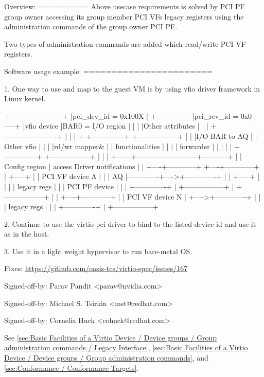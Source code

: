 {Overview:
=========
Above usecase requirements is solved by PCI PF group owner accessing
its group member PCI VFs legacy registers using the administration
commands of the group owner PCI PF.

Two types of administration commands are added which read/write PCI VF
registers.

Software usage example:
=======================

1. One way to use and map to the guest VM is by using vfio driver
framework in Linux kernel.

                +----------------------+
                |pci_dev_id = 0x100X   |
+---------------|pci_rev_id = 0x0      |-----+
|vfio device    |BAR0 = I/O region     |     |
|               |Other attributes      |     |
|               +----------------------+     |
|                                            |
+   +--------------+     +-----------------+ |
|   |I/O BAR to AQ |     | Other vfio      | |
|   |rd/wr mapper\& |     | functionalities | |
|   | forwarder    |     |                 | |
|   +--------------+     +-----------------+ |
|                                            |
+------+-------------------------+-----------+
       |                         |
   Config region                 |
     access                Driver notifications
       |                         |
  +----+------------+       +----+------------+
  | +-----+         |       | PCI VF device A |
  | | AQ  |-------------+---->+-------------+ |
  | +-----+         |   |   | | legacy regs | |
  | PCI PF device   |   |   | +-------------+ |
  +-----------------+   |   +-----------------+
                        |
                        |   +----+------------+
                        |   | PCI VF device N |
                        +---->+-------------+ |
                            | | legacy regs | |
                            | +-------------+ |
                            +-----------------+

2. Continue to use the virtio pci driver to bind to the
   listed device id and use it as in the host.

3. Use it in a light weight hypervisor to run bare-metal OS.

Fixes: \url{https://github.com/oasis-tcs/virtio-spec/issues/167}

Signed-off-by: Parav Pandit <parav@nvidia.com>

Signed-off-by: Michael S. Tsirkin <mst@redhat.com>

Signed-off-by: Cornelia Huck <cohuck@redhat.com>

See \ref{sec:Basic Facilities of a Virtio Device / Device groups / Group administration commands / Legacy Interface},
\ref{sec:Basic Facilities of a Virtio Device / Device groups / Group administration commands},
and \ref{sec:Conformance / Conformance Targets}.
 } \\
\hline
